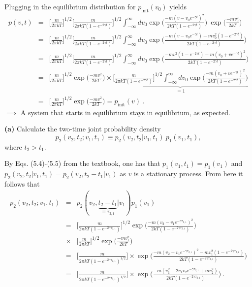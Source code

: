 Plugging in the equilibrium distribution for $p_\text{init}(v_0)$ yields
\begin{eqnarray}
p(v, t) &=& \bigg[\frac{m}{2\pi k T}\bigg]^{1/2} \bigg[\frac{m}{2\pi k T (1-e^{-2\gamma t})}\bigg]^{1/2}  \int_{-\infty}^{\infty} d v_0 \exp\bigg(\frac{-m(v-v_0 e^{-\gamma t})^2}{2 k T (1-e^{-2\gamma t})}\bigg)~\exp\bigg(\frac{-mv_0^2}{2 k T} \bigg) \nonumber \\
&=& \bigg[\frac{m}{2\pi k T}\bigg]^{1/2} \bigg[\frac{m}{2\pi k T (1-e^{-2\gamma t})}\bigg]^{1/2} \int_{-\infty}^{\infty} d v_0 \exp\bigg(\frac{-m(v-v_0 e^{-\gamma t})-m v_0^2 (1-e^{-2\gamma t})}{2 k T (1-e^{-2\gamma t})}\bigg) \nonumber \\
&=& \bigg[\frac{m}{2\pi k T}\bigg]^{1/2} \bigg[\frac{m}{2\pi k T (1-e^{-2\gamma t})}\bigg]^{1/2} \int_{-\infty}^{\infty} d v_0 \exp\bigg(\frac{-mv^2 (1-e^{-2\gamma t})-m (v_0+ve^{-\gamma t})^2}{2 k T (1-e^{-2\gamma t})}\bigg) \nonumber \\
&=& \bigg[\frac{m}{2\pi k T}\bigg]^{1/2} \exp\bigg(\frac{-mv^2}{2 k T}\bigg) \times  \underbrace{\bigg[\frac{m}{2\pi k T (1-e^{-2\gamma t})}\bigg]^{1/2} \int_{-\infty}^{\infty} d v_0 \exp\bigg(\frac{-m (v_0+ve^{-\gamma t})^2}{2 k T (1-e^{-2\gamma t})}\bigg)}_{=1} \nonumber \\
&=& \boxed{\bigg[\frac{m}{2\pi k T}\bigg]^{1/2} \exp\bigg(\frac{-mv^2}{2 k T}\bigg)  = p_\text{init}(v)}~.
\end{eqnarray}
$\implies$ A system that starts in equilibrium stays in equilibrium, as expected.

\textbf{(a)} Calculate the two-time joint probability density
\begin{equation}
p_2(v_2,t_2;v_1,t_1) \equiv p_2(v_2, t_2 | v_1, t_1)~p_1(v_1, t_1),
\end{equation}
where $t_2>t_1$.

By Eqs. (5.4)-(5.5) from the textbook, one has that $p_1(v_1, t_1)=p_1(v_1)$ and $p_2(v_2, t_2 | v_1, t_1) = p_2(v_2, t_2-t_1 | v_1)$ as $v$ is a stationary process. From here it follows that
\begin{eqnarray}
p_2(v_2,t_2;v_1,t_1) &=& p_2(v_2, \underbrace{t_2-t_1}_{\equiv\tau_{2,1}} | v_1) p_1(v_1) \nonumber \\
&=& \bigg[\frac{m}{2\pi k T (1-e^{-2\gamma \tau_{2,1}})}\bigg]^{1/2} \exp\bigg(\frac{-m(v_2-v_1 e^{-\gamma \tau_{2,1}})^2}{2 k T (1-e^{-2\gamma \tau_{2,1}})}\bigg) \nonumber \\
&\times& \bigg[\frac{m}{2\pi k T}\bigg]^{1/2} \exp\bigg(\frac{-mv_1^2}{2 k T}\bigg) \nonumber \\
&=& \bigg[\frac{m}{2\pi k T (1-e^{-2\gamma \tau_{2,1}})^{1/2}}\bigg] \times \exp\bigg(\frac{-m(v_2-v_1 e^{-\gamma \tau_{2,1}})^2 -m v_1^2 (1-e^{-2\gamma \tau_{2,1}})}{2 k T (1-e^{-2\gamma \tau_{2,1}})} \bigg) \nonumber \\
&=& \boxed{\bigg[\frac{m}{2\pi k T (1-e^{-2\gamma \tau_{2,1}})^{1/2}}\bigg] \times \exp\bigg(\frac{-m(v_1^2-2 v_1 v_2 e^{-\gamma \tau_{2,1}} + m v_2^2)}{2 k T (1-e^{-2\gamma \tau_{2,1}})} \bigg)}~.  \label{eq:2_time_joint_probability}
\end{eqnarray}

